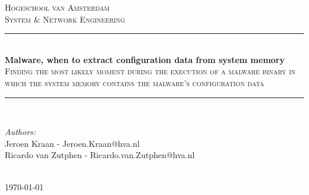 \documentclass[conference]{IEEEtran}
\begin{document}
\begin{titlepage}

\newcommand{\HRule}{\rule{\linewidth}{0.4mm}} %

\center %
 

\textsc{\LARGE Hogeschool van Amsterdam}\\[1.2cm] 
\textsc{\Large System \& Network Engineering}\\[0.5cm] 



\HRule \\[0.6cm]
{ \huge \bfseries Malware, when to extract configuration data from system memory}\\[0.4cm] %
\textsc{\large Finding the most likely moment during the execution of a malware binary in which the system memory contains the malware's configuration data}\\[0.5cm] %
\HRule \\[4.0cm]

 

\begin{minipage}{1.4\textwidth}
\begin{flushleft} \large
\emph{Authors:}\\
Jeroen Kraan - Jeroen.Kraan@hva.nl\\
Ricardo van Zutphen - Ricardo.van.Zutphen@hva.nl
\end{flushleft}
\end{minipage}

\begin{minipage}{0.4\textwidth}
\end{minipage}\\[4cm]



{\large \today}\\[3cm] %
\vfill %

\end{titlepage}
\onecolumn
\tableofcontents
\end{document}
